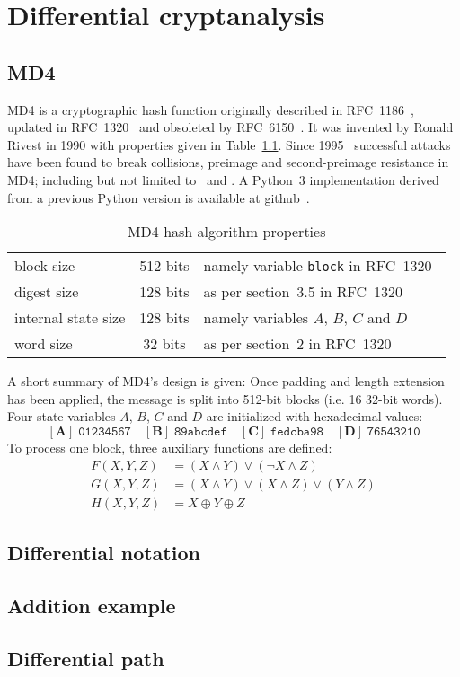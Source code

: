 \renewcommand*\chappic{diff-crypt.pdf_tex}
\chapter{Differential cryptanalysis}
\label{ch:diff-crypt}
%

\section{MD4}
\label{ch:md4}
%
MD4 is a cryptographic hash function originally described in RFC~1186~\cite{rfc1186},
updated in RFC~1320~\cite{rfc1320} and obsoleted by RFC~6150~\cite{rfc6150}. It was
invented by Ronald Rivest in 1990 with properties given in Table~\ref{tab:md4}.
Since 1995~\cite{Dobbertin1998} successful attacks have been found to break collisions,
preimage and second-preimage resistance in MD4; including but not limited to~\cite{md4-2007} and
\cite{cryptoeprint:2005:151}. A Python~3 implementation derived from a previous Python version
is available at github~\cite{md4-py3k}.

\begin{table}[h]
  \begin{center}
    \begin{tabular}{lcl}
      block size           & 512 bits       & namely variable \texttt{block} in RFC~1320~\cite{rfc1320} \\
      digest size          & 128 bits       & as per section~3.5 in RFC~1320~\cite{rfc1320} \\
      internal state size  & 128 bits       & namely variables $A$, $B$, $C$ and $D$ \\
      word size            & 32 bits        & as per section~2 in RFC~1320~\cite{rfc1320} \\
    \end{tabular}
    \caption{MD4 hash algorithm properties}
    \label{tab:md4}
  \end{center}
\end{table}

A short summary of MD4's design is given:
Once padding and length extension has been applied, the message is split into 512-bit blocks
(i.e. 16 32-bit words). Four state variables $A$, $B$, $C$ and $D$ are initialized
with hexadecimal values:
\[
  \mathbf{[A]}\; \mathtt{01234567} \quad
  \mathbf{[B]}\; \mathtt{89abcdef} \quad
  \mathbf{[C]}\; \mathtt{fedcba98} \quad
  \mathbf{[D]}\; \mathtt{76543210}
\]
To process one block, three auxiliary functions are defined:
\begin{align}
  F(X,Y,Z) &= (X \land Y) \lor (\neg X \land Z) \\
  G(X,Y,Z) &= (X \land Y) \lor (X \land Z) \lor (Y \land Z) \\
  H(X,Y,Z) &= X \oplus Y \oplus Z
\end{align}

\section{Differential notation}
\section{Addition example}
\section{Differential path}
